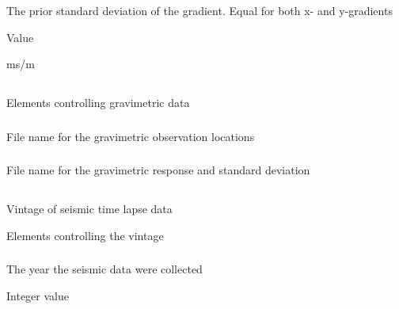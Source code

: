 \subsubsection{}
 \slist
   \item \Description The prior standard deviation of the gradient. Equal for both x- and y-gradients
   \item \Argument Value
   \item {} ms/m
 \elist

\subsection{}
 \slist
\item \Description Elements controlling gravimetric data
   \item \Argument
   \item \Default
 \elist

\subsubsection{}
 \slist
   \item \Description File name for the gravimetric observation locations
   \item \Argument 
   \item \Default 
 \elist

\subsubsection{}
 \slist
   \item \Description File name for the gravimetric response and standard deviation
   \item \Argument
   \item \Default
 \elist

\subsection{}
 \slist
   \item \Description Vintage of seismic time lapse data
   \item \Argument Elements controlling the vintage
   \item \Default
 \elist
 
 \subsubsection{}
 \slist
   \item \Description The year the seismic data were collected
   \item \Argument Integer value
   \item \Default 
 \elist

